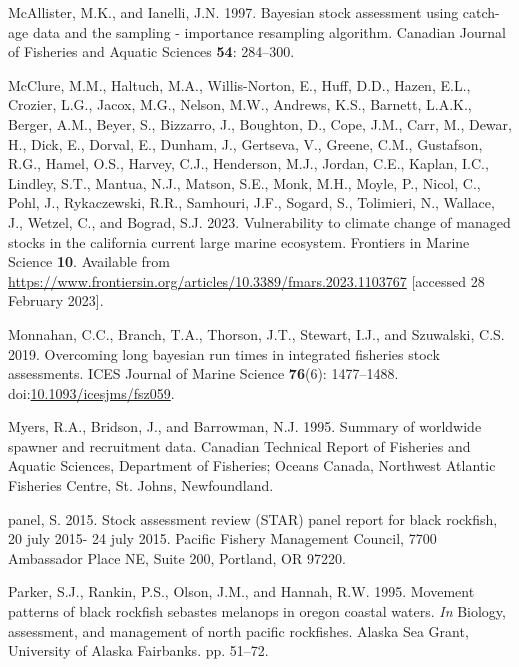 \documentclass[11pt,
  english,
  letterpaper,
]{article}
\newlength{\cslhangindent}
\newenvironment{CSLReferences}[2] %
 {%
  \setlength{\parindent}{0pt}
  \ifodd #1 \everypar{\setlength{\hangindent}{\cslhangindent}}\ignorespaces\fi
  \ifnum #2 > 0
  \setlength{\parskip}{#2\baselineskip}
  \fi
 }%
 {}
\begin{document}
\begin{CSLReferences}{1}{0}
\leavevmode{}%
McAllister, M.K., and Ianelli, J.N. 1997. Bayesian stock assessment using catch-age data and the sampling - importance resampling algorithm. Canadian Journal of Fisheries and Aquatic Sciences \textbf{54}: 284--300.

\leavevmode{}%
McClure, M.M., Haltuch, M.A., Willis-Norton, E., Huff, D.D., Hazen, E.L., Crozier, L.G., Jacox, M.G., Nelson, M.W., Andrews, K.S., Barnett, L.A.K., Berger, A.M., Beyer, S., Bizzarro, J., Boughton, D., Cope, J.M., Carr, M., Dewar, H., Dick, E., Dorval, E., Dunham, J., Gertseva, V., Greene, C.M., Gustafson, R.G., Hamel, O.S., Harvey, C.J., Henderson, M.J., Jordan, C.E., Kaplan, I.C., Lindley, S.T., Mantua, N.J., Matson, S.E., Monk, M.H., Moyle, P., Nicol, C., Pohl, J., Rykaczewski, R.R., Samhouri, J.F., Sogard, S., Tolimieri, N., Wallace, J., Wetzel, C., and Bograd, S.J. 2023. Vulnerability to climate change of managed stocks in the california current large marine ecosystem. Frontiers in Marine Science \textbf{10}. Available from \url{https://www.frontiersin.org/articles/10.3389/fmars.2023.1103767} {[}accessed 28 February 2023{]}.

\leavevmode{}%
Monnahan, C.C., Branch, T.A., Thorson, J.T., Stewart, I.J., and Szuwalski, C.S. 2019. Overcoming long bayesian run times in integrated fisheries stock assessments. {ICES} Journal of Marine Science \textbf{76}(6): 1477--1488. doi:\href{https://doi.org/10.1093/icesjms/fsz059}{10.1093/icesjms/fsz059}.

\leavevmode{}%
Myers, R.A., Bridson, J., and Barrowman, N.J. 1995. Summary of worldwide spawner and recruitment data. Canadian Technical Report of Fisheries and Aquatic Sciences, Department of Fisheries; Oceans Canada, Northwest Atlantic Fisheries Centre, St. Johns, Newfoundland.

\leavevmode{}%
panel, S. 2015. Stock assessment review (STAR) panel report for black rockfish, 20 july 2015- 24 july 2015. Pacific Fishery Management Council, 7700 Ambassador Place NE, Suite 200, Portland, OR 97220.

\leavevmode{}%
Parker, S.J., Rankin, P.S., Olson, J.M., and Hannah, R.W. 1995. Movement patterns of black rockfish sebastes melanops in oregon coastal waters. \emph{In} Biology, assessment, and management of north pacific rockfishes. Alaska Sea Grant, University of Alaska Fairbanks. pp. 51--72.


\end{CSLReferences}
\end{document}
